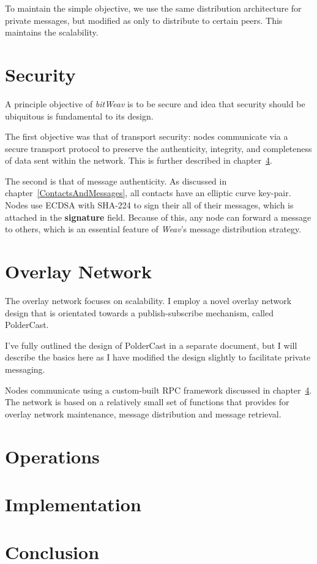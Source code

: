\documentclass[10pt,a4paper,onecolumn]{article}
\begin{document}
To maintain the simple objective, we use the same distribution architecture for private messages, but modified as only to distribute to certain peers. This maintains the scalability. 

\section{Security}
\label{security}
A principle objective of \textit{bitWeav} is to be secure and idea that security should be ubiquitous is fundamental to its design.

The first objective was that of transport security: nodes communicate via a secure transport protocol to preserve the authenticity, integrity, and completeness of data sent within the network. This is further described in chapter~\ref{impl}. 

The second is that of message authenticity. As discussed in chapter~\ref{ContactsAndMessages}, all contacts have an elliptic curve key-pair. Nodes use ECDSA with SHA-224 to sign their all of their messages, which is attached in the \textbf{signature} field. Because of this, any node can forward a message to others, which is an essential feature of \textit{Weav}'s message distribution strategy.

\section{Overlay Network}
\label{network}
The overlay network focuses on scalability. I employ a novel overlay network design that is orientated towards a publish-subscribe mechanism, called PolderCast.

I've fully outlined the design of PolderCast in a separate document\cite{PolderCastDesignOutline}, but I will describe the basics here as I have modified the design slightly to facilitate private messaging.

Nodes communicate using a custom-built RPC framework discussed in chapter~\ref{impl}. The network is based on a relatively small set of functions that provides for overlay network maintenance, message distribution and message retrieval. 

\section{Operations}

\section{Implementation}
\label{impl}


\section{Conclusion}


\end{document}
